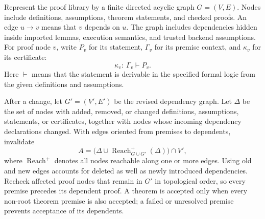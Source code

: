 \documentclass[11pt]{article}
\begin{document}
Represent the proof library by a finite directed acyclic graph $G=(V,E)$. Nodes include definitions, assumptions, theorem statements, and checked proofs. An edge $u\to v$ means that $v$ depends on $u$. The graph includes dependencies hidden inside imported lemmas, execution semantics, and trusted backend assumptions. For proof node $v$, write $P_v$ for its statement, $\Gamma_v$ for its premise context, and $\kappa_v$ for its certificate:
\begin{equation}
 \kappa_v:\ \Gamma_v\vdash P_v.
\end{equation}
Here $\vdash$ means that the statement is derivable in the specified formal logic from the given definitions and assumptions.

After a change, let $G'=(V',E')$ be the revised dependency graph. Let $\Delta$ be the set of nodes with added, removed, or changed definitions, assumptions, statements, or certificates, together with nodes whose incoming dependency declarations changed. With edges oriented from premises to dependents, invalidate
\begin{equation}
 A=\bigl(\Delta\cup\operatorname{Reach}^{+}_{G\cup G'}(\Delta)\bigr)\cap V',
 \label{eq:invalidate}
\end{equation}
where $\operatorname{Reach}^{+}$ denotes all nodes reachable along one or more edges. Using old and new edges accounts for deleted as well as newly introduced dependencies. Recheck affected proof nodes that remain in $G'$ in topological order, so every premise precedes its dependent proof. A theorem is accepted only when every non-root theorem premise is also accepted; a failed or unresolved premise prevents acceptance of its dependents.
\end{document}
